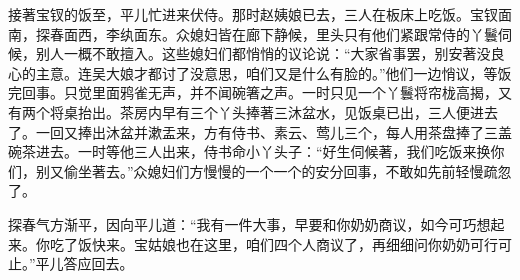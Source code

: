 \begin{parag}
    接著宝钗的饭至，平儿忙进来伏侍。那时赵姨娘已去，三人在板床上吃饭。宝钗面南，探春面西，李纨面东。众媳妇皆在廊下静候，里头只有他们紧跟常侍的丫鬟伺候，别人一概不敢擅入。这些媳妇们都悄悄的议论说：“大家省事罢，别安著没良心的主意。连吴大娘才都讨了没意思，咱们又是什么有脸的。”他们一边悄议，等饭完回事。只觉里面鸦雀无声，并不闻碗箸之声。一时只见一个丫鬟将帘栊高揭，又有两个将桌抬出。茶房内早有三个丫头捧著三沐盆水，见饭桌已出，三人便进去了。一回又捧出沐盆并漱盂来，方有侍书、素云、莺儿三个，每人用茶盘捧了三盖碗茶进去。一时等他三人出来，侍书命小丫头子：“好生伺候著，我们吃饭来换你们，别又偷坐著去。”众媳妇们方慢慢的一个一个的安分回事，不敢如先前轻慢疏忽了。
\end{parag}


\begin{parag}
    探春气方渐平，因向平儿道：“我有一件大事，早要和你奶奶商议，如今可巧想起来。你吃了饭快来。宝姑娘也在这里，咱们四个人商议了，再细细问你奶奶可行可止。”平儿答应回去。
\end{parag}


